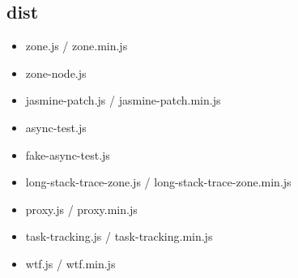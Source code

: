 \subsection{dist}


\begin{itemize}
  \item zone.js / zone.min.js
  \item zone-node.js
  \item jasmine-patch.js / jasmine-patch.min.js
\end{itemize}



\begin{itemize}
  \item async-test.js
  \item fake-async-test.js
  \item long-stack-trace-zone.js / long-stack-trace-zone.min.js
  \item proxy.js / proxy.min.js
  \item task-tracking.js / task-tracking.min.js
  \item wtf.js / wtf.min.js
\end{itemize}

